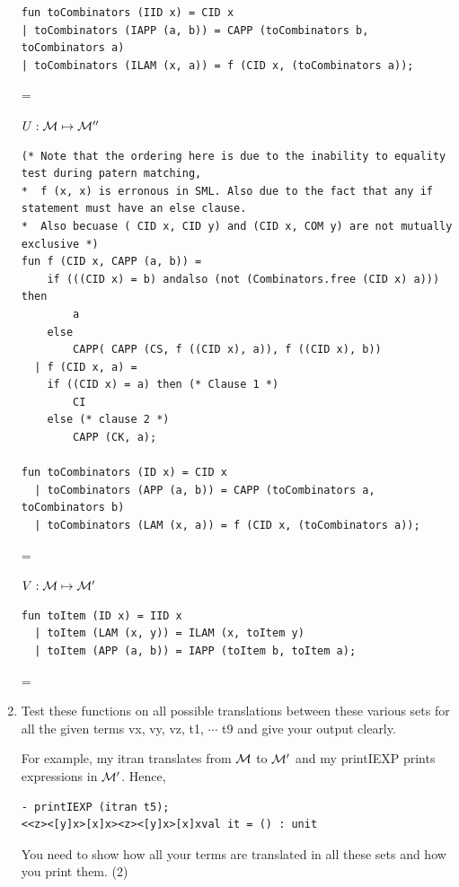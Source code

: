 \documentclass[11pt]{article}
\newenvironment{neverbreak} %
{\par\nobreak\vfil\penalty0\vfilneg
	\vtop\bgroup}
{\par\xdef\tpd{\the\prevdepth}\egroup
	\prevdepth=\tpd}
\begin{document}
\begin{enumerate}
\begin{neverbreak}
\begin{verbatim}
fun toCombinators (IID x) = CID x
| toCombinators (IAPP (a, b)) = CAPP (toCombinators b, toCombinators a)
| toCombinators (ILAM (x, a)) = f (CID x, (toCombinators a));
	\end{verbatim}
\end{neverbreak}
\vspace{1cm}
\begin{neverbreak}
	$U:{\cal M}\mapsto {\cal M}''$\\
	
	\begin{verbatim}
(* Note that the ordering here is due to the inability to equality test during patern matching, 
*  f (x, x) is erronous in SML. Also due to the fact that any if statement must have an else clause. 
*  Also becuase ( CID x, CID y) and (CID x, COM y) are not mutually exclusive *)
fun f (CID x, CAPP (a, b)) = 
	if (((CID x) = b) andalso (not (Combinators.free (CID x) a))) then
		a
	else
		CAPP( CAPP (CS, f ((CID x), a)), f ((CID x), b))
  | f (CID x, a) =
	if ((CID x) = a) then (* Clause 1 *)
		CI 
	else (* clause 2 *)
		CAPP (CK, a);

fun toCombinators (ID x) = CID x
  | toCombinators (APP (a, b)) = CAPP (toCombinators a, toCombinators b)
  | toCombinators (LAM (x, a)) = f (CID x, (toCombinators a));
	\end{verbatim}
\end{neverbreak}

\vspace{1cm}
\begin{neverbreak}
	$V:{\cal M}\mapsto{\cal M}'$\\
	
	\begin{verbatim}
fun toItem (ID x) = IID x
  | toItem (LAM (x, y)) = ILAM (x, toItem y)
  | toItem (APP (a, b)) = IAPP (toItem b, toItem a);
	\end{verbatim}
\end{neverbreak}

\pagebreak
\item
  Test these functions on all possible translations between these various sets for all the given terms vx, vy, vz, t1, $\cdots$ t9 and give your output clearly.

  For example, my itran translates from ${\cal M}$ to ${\cal M}'$ and my printIEXP prints expressions in ${\cal M}'$.  Hence,  
\begin{verbatim}
- printIEXP (itran t5);
<<z><[y]x>[x]x><z><[y]x>[x]xval it = () : unit
\end{verbatim}
You need to show how all your terms are translated in all these sets and how you print them.
\hfill{(2)}\\ %


\end{enumerate}
\end{document}
